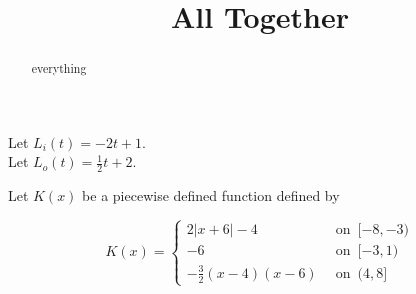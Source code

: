 \documentclass{ximera}
\title{All Together}
\begin{document}
\begin{abstract}
everything
\end{abstract}
\maketitle








Let $L_i(t) = -2t + 1$. \\
Let $L_o(t) = \frac{1}{2}t + 2$.


Let $K(x)$ be a piecewise defined function defined by 


\[
K(x) = 
\begin{cases}
  2|x+6| - 4         &    \,     \text{ on } \,   [-8,-3)    \\
  -6               &    \,     \text{ on } \,    [-3,1)      \\
  -\frac{3}{2}(x-4)(x-6)    &   \,     \text{ on } \,    (4,8]
\end{cases}
\]
\end{document}
